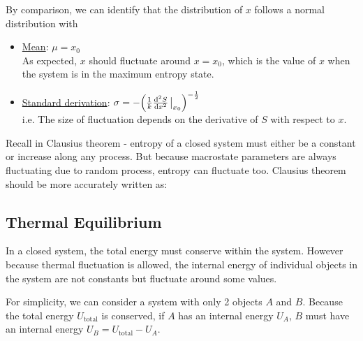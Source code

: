 \documentclass[class=article, crop=false, 12pt]{standalone}
\begin{document}
By comparison, we can identify that the distribution of $x$ follows a normal distribution with
\begin{itemize}
    \item \ul{Mean}: $\mu=x_0$\\
    As expected, $x$ should fluctuate around $x=x_0$,
    which is the value of $x$ when the system is in the maximum entropy state.
    
    \item \ul{Standard derivation}: $\sigma = -\qty(\inv{k}\dv[2]{S}{x}\eval_{x_0})^{-\half}$\\
    i.e. The size of fluctuation depends on the  derivative of $S$ with respect to $x$.

\end{itemize}


\begin{notation}
    Recall in Clausius theorem - 
    entropy of a closed system must either be a constant 
    or increase along any process.
    But because macrostate parameters are always fluctuating due to random process,
    entropy can fluctuate too. 
    Clausius theorem should be more accurately written as:

\end{notation}




\subsection{Thermal Equilibrium}

In a closed system, the total energy must conserve within the system.
However because thermal fluctuation is allowed,
the internal energy of individual objects in the system are not constants
but fluctuate around some values.


For simplicity, we can consider a system with only 2 objects $A$ and $B$.
Because the total energy $U_\text{total}$ is conserved, 
if $A$ has an internal energy $U_A$, $B$ must have an internal energy $U_B = U_\text{total}- U_A$.
\begin{center}
\end{center}
\end{document}
